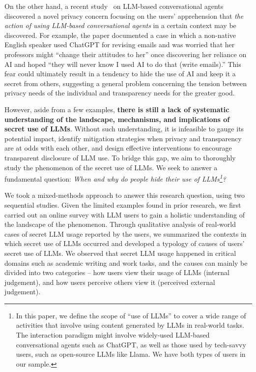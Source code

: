 On the other hand, a recent study~\cite{zhang2024s} on LLM-based conversational agents discovered a novel privacy concern focusing on the users' apprehension that \textit{the action of using LLM-based conversational agents} in a certain context may be discovered.
For example, the paper documented a case in which a non-native English speaker used ChatGPT for revising emails and was worried that her professors might ``change their attitudes to her'' once discovering her reliance on AI and hoped ``they will never know I used AI to do that (write emails).''
This fear could ultimately result in a tendency to hide the use of AI and keep it a secret from others, suggesting a general problem concerning the tension between privacy needs of the individual and transparency needs for the greater good.

However, aside from a few examples, \textbf{there is still a lack of systematic understanding of the landscape, mechanisms, and implications of secret use of LLMs}. Without such understanding, it is infeasible to gauge its potential impact, identify mitigation strategies when privacy and transparency are at odds with each other, and design effective interventions to encourage transparent disclosure of LLM use.
To bridge this gap, we aim to thoroughly study the phenomenon of the secret use of LLMs.
We seek to answer a fundamental question: \textit{When and why do people hide their use of LLMs\footnote{In this paper, we define the scope of ``use of LLMs'' to cover a wide range of activities that involve using content generated by LLMs in real-world tasks. The interaction paradigm might involve widely-used LLM-based conversational agents such as ChatGPT, as well as those used by tech-savvy users, such as open-source LLMs like Llama. We have both types of users in our sample.}?} 

We took a mixed-methods approach to answer this research question, using two sequential studies. 
Given the limited examples found in prior research, we first carried out an online survey with \surveyallusernumber{} LLM users to gain a holistic understanding of the landscape of the phenomenon. 
Through qualitative analysis of \surveycasenumber{} real-world cases of secret LLM usage reported by the users, we summarized the contexts in which secret use of LLMs occurred and developed a typology of causes of users' secret use of LLMs.
We observed that secret LLM usage happened in critical domains such as academic writing and work tasks, and the causes can mainly be divided into two categories -- how users view their usage of LLMs (internal judgement), and how users perceive others view it (perceived external judgement).


